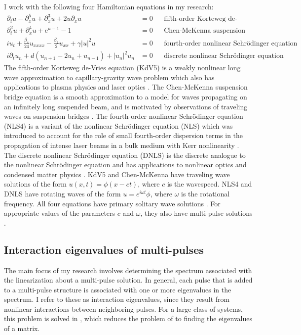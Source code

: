 \documentclass[12pt,reqno,oneside]{article}
\theoremstyle{definition}
\theoremstyle{remark}
\begin{document}
I work with the following four Hamiltonian equations in my research:
\begin{align*}
\partial_t u - \partial_x^5 u + \partial_x^3 u + 2 u \partial_x u &= 0 && \text{fifth-order Korteweg de-Vries equation} \\
\partial_t^2 u + \partial_x^4 u + \mathrm{e}^{u-1} - 1 &= 0 &&\text{Chen-McKenna suspension bridge equation} \\
i u_t + \frac{\beta_4}{24}u_{xxxx} - \frac{\beta_2}{2}u_{xx} + \gamma |u|^2 u &= 0 && 
\text{fourth-order nonlinear Schr{\"o}dinger equation } \\
i\partial_t u_n + d(u_{n+1} - 2 u_n + u_{n-1}) + |u_n|^2 u_n &= 0 &&\text{discrete nonlinear Schr{\"o}dinger equation}
\end{align*}
The fifth-order Korteweg de-Vries equation (KdV5) is a weakly nonlinear long wave approximation to capillary-gravity wave problem which also has applications to plasma physics and laser optics \cite{Pelinovsky2007}. The Chen-McKenna suspension bridge equation is a smooth approximation to a model for waves propagating on an infinitely long suspended beam, and is motivated by observations of traveling waves on suspension bridges \cite{McKenna1990,Chen1997}. The fourth-order nonlinear Schr{\"o}dinger equation (NLS4) is a variant of the nonlinear Schr{\"o}dinger equation (NLS) which was introduced to account for the role of small fourth-order dispersion terms in the propagation of intense laser beams in a bulk medium with Kerr nonlinearity \cite{Karpman2000,Tam2020}. The discrete nonlinear Schr{\"o}dinger equation (DNLS) is the discrete analogue to the nonlinear Schr{\"o}dinger equation and has applications to nonlinear optics and condensed matter physics \cite{Kevrekidis2009}. KdV5 and Chen-McKenna have traveling wave solutions of the form $u(x, t) = \phi(x - ct)$, where $c$ is the wavespeed. NLS4 and DNLS have rotating waves of the form $u = e^{i\omega t}\phi$, where $\omega$ is the rotational frequency. All four equations have primary solitary wave solutions \cite{Pelinovsky2007,Berg2018,Parker2020NLS4,Kevrekidis2009}. For appropriate values of the parameters $c$ and $\omega$, they also have multi-pulse solutions \cite{Buffoni1996,SandstedeStrut,Parker2020NLS4,Parker2020}.

\subsection{Interaction eigenvalues of multi-pulses}

The main focus of my research involves determining the spectrum associated with the linearization about a multi-pulse solution. In general, each pulse that is added to a multi-pulse structure is associated with one or more eigenvalues in the spectrum. I refer to these as interaction eigenvalues, since they result from nonlinear interactions between neighboring pulses. For a large class of systems, this problem is solved in \cite{Sandstede1998}, which reduces the problem of to finding the eigenvalues of a matrix.
\end{document}
